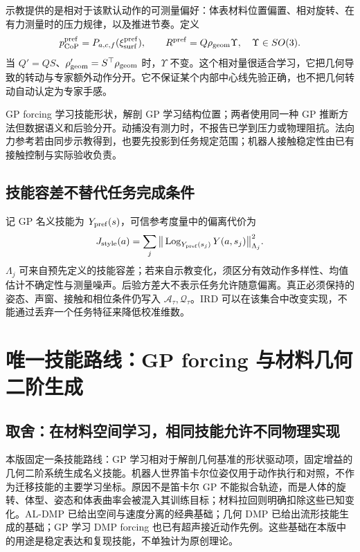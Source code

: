 \documentclass[11pt,a4paper]{article}
\numberwithin{equation}{section}
\theoremstyle{definition}
\begin{document}
示教提供的是相对于该默认动作的可测量偏好：体表材料位置偏置、相对旋转、在有力测量时的压力规律，以及推进节奏。定义
\begin{equation}
 p_{\rm CoP}^{\rm pref}=P_{a,c,f}(\xi_{\rm surf}^{\rm pref}),\qquad
 R^{\rm pref}=Q\rho_{\rm geom}\Upsilon,\quad\Upsilon\in SO(3).
\end{equation}
当 $Q'=QS$、$\rho_{\rm geom}'=S^\top\rho_{\rm geom}$ 时，$\Upsilon$ 不变。这个相对量很适合学习，它把几何导致的转动与专家额外动作分开。它不保证某个内部中心线先验正确，也不把几何转动自动认定为专家手感。

GP forcing 学习技能形状，解剖 GP 学习结构位置；两者使用同一种 GP 推断方法但数据语义和后验分开。动捕没有测力时，不报告已学到压力或物理阻抗。法向力参考若由同步示教得到，也要先投影到任务规定范围；机器人接触稳定性由已有接触控制与实际验收负责。

\subsection{技能容差不替代任务完成条件}
记 GP 名义技能为 $Y_{\rm pref}(s)$，可信参考度量中的偏离代价为
\begin{equation}
 J_{\rm style}(a)=\sum_j
 \big\|\operatorname{Log}_{Y_{\rm pref}(s_j)}Y(a,s_j)\big\|^2_{\Lambda_j}.
\end{equation}
$\Lambda_j$ 可来自预先定义的技能容差；若来自示教变化，须区分有效动作多样性、均值估计不确定性与测量噪声。后验方差大不表示任务允许随意偏离。真正必须保持的姿态、声窗、接触和相位条件仍写入 $\mathcal A_\tau,\mathcal Q_\tau$。IRD 可以在该集合中改变实现，不能通过丢弃一个任务特征来降低校准维数。

\section{唯一技能路线：GP forcing 与材料几何二阶生成}
\label{sec:v43-geometric-skill}

\subsection{取舍：在材料空间学习，相同技能允许不同物理实现}
本版固定一条技能路线：GP 学习相对于解剖几何基准的形状驱动项，固定增益的几何二阶系统生成名义技能。机器人世界笛卡尔位姿仅用于动作执行和对照，不作为迁移技能的主要学习坐标。原因不是笛卡尔 GP 不能拟合轨迹，而是人体的旋转、体型、姿态和体表曲率会被混入其训练目标；材料拉回则明确扣除这些已知变化。AL-DMP 已给出空间与速度分离的经典基础\cite{aldmp2016}；几何 DMP 已给出流形技能生成的基础\cite{gdmp2024}；GP 学习 DMP forcing 也已有超声接近动作先例\cite{gpdmp2026}。这些基础在本版中的用途是稳定表达和复现技能，不单独计为原创理论。
\end{document}
